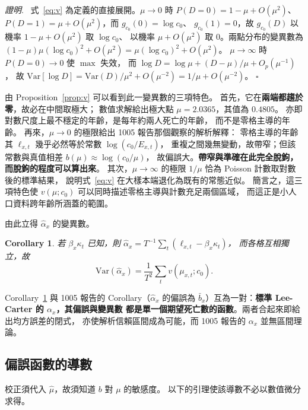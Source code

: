 \documentclass[UTF8, fontset=macnew, a4paper, 12pt]{ctexart}
\newtheorem{cor}{Corollary}
\newenvironment{proof}{\par\noindent\textit{證明}.\ }{\hfill$\square$\par\vspace{4pt}}
\begin{document}
\begin{proof}
式~\eqref{eq:v} 為定義的直接展開。$\mu\to0$ 時
$P(D=0)=1-\mu+O(\mu^2)$、$P(D=1)=\mu+O(\mu^2)$，而 $g_{c_0}(0)=\log c_0$、
$g_{c_0}(1)=0$，故 $g_{c_0}(D)$ 以機率 $1-\mu+O(\mu^2)$ 取 $\log c_0$、
以機率 $\mu+O(\mu^2)$ 取 $0$。兩點分布的變異數為
$(1-\mu)\mu(\log c_0)^2+O(\mu^2)=\mu(\log c_0)^2+O(\mu^2)$。
$\mu\to\infty$ 時 $P(D=0)\to0$ 使 $\max$ 失效，
而 $\log D=\log\mu+(D-\mu)/\mu+O_p(\mu^{-1})$，
故 $\mathrm{Var}[\log D]=\mathrm{Var}(D)/\mu^2+O(\mu^{-2})=1/\mu+O(\mu^{-2})$。
\end{proof}

由 Proposition~\ref{prop:v} 可以看到此一變異數的三項特色。
首先，它在\textbf{兩端都趨於零}，故必在中間取極大；
數值求解給出極大點 $\mu=2.0365$，其值為 $0.4805$。
亦即對數尺度上最不穩定的年齡，是每年約兩人死亡的年齡，
而不是零格主導的年齡。
再來，$\mu\to0$ 的極限給出 1005 報告那個觀察的解析解釋：
零格主導的年齡其 $\ell_{x,t}$ 幾乎必然等於常數 $\log(c_0/E_{x,t})$，
重複之間幾無變動，故帶窄；但該常數與真值相差 $b(\mu)\approx\log(c_0/\mu)$，
故偏誤大。\textbf{帶窄與準確在此完全脫鉤，而脫鉤的程度可以算出來}。
其次，$\mu\to\infty$ 的極限 $1/\mu$ 恰為 Poisson 計數取對數後的標準結果，
說明式~\eqref{eq:v} 在大樣本端退化為既有的常態近似。
簡言之，這三項特色使 $v(\mu;c_0)$ 可以同時描述零格主導與計數充足兩個區域，
而這正是小人口資料跨年齡所涵蓋的範圍。

由此立得 $\hat\alpha_x$ 的變異數。

\begin{cor}\label{cor:var}
若 $\beta_x\kappa_t$ 已知，則 $\hat\alpha_x=T^{-1}\sum_t(\ell_{x,t}-\beta_x\kappa_t)$，
而各格互相獨立，故
\begin{equation}\label{eq:valpha}
\mathrm{Var}(\hat\alpha_x)=\frac{1}{T^{2}}\sum_{t}v(\mu_{x,t};c_0).
\end{equation}
\end{cor}

Corollary~\ref{cor:var} 與 1005 報告的 Corollary（$\hat\alpha_x$ 的偏誤為
$\bar b_x$）互為一對：\textbf{標準 Lee-Carter 的 $\alpha_x$，其偏誤與變異數
都是單一個期望死亡數的函數}。兩者合起來即給出均方誤差的閉式，
亦使解析信賴區間成為可能，而 1005 報告的 $\alpha_x$ 並無區間理論。

\subsection{偏誤函數的導數}

校正須代入 $\hat\mu$，故須知道 $b$ 對 $\mu$ 的敏感度。
以下的引理使該導數不必以數值微分求得。
\end{document}
